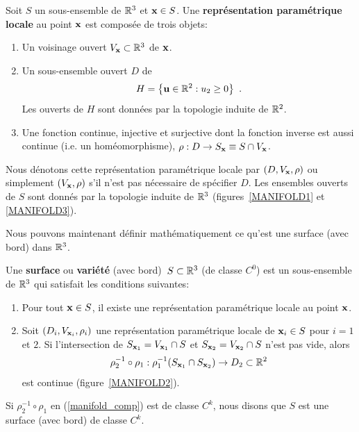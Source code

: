 {\begin{defn} 
Soit $S$ un sous-ensemble de $\mathbb{R}^3$ et $\mathbf{x} \in S$.  Une
{\bfseries représentation paramétrique locale} au point $\mathbf{x}$ est
composée de trois objets:
\begin{enumerate}
\item Un voisinage ouvert $V_{\mathbf{x}} \subset \mathbb{R}^3$ de $\mathbf{x}$.
\item Un sous-ensemble ouvert $D$ de
\[
H = \left\{ \mathbf{u} \in \mathbb{R}^2 : u_2 \geq 0 \right\} \ .
\]
Les ouverts de $H$ sont données par la topologie induite de $\mathbb{R}^2$.
\item Une fonction continue, injective et surjective dont la fonction inverse
est aussi continue (i.e. un homéomorphisme),
$\rho:D\rightarrow S_{\mathbf{x}} \equiv S \cap V_{\mathbf{x}}$.
\end{enumerate}
Nous dénotons cette représentation paramétrique locale par
$(D,V_{\mathbf{x}},\rho)$ ou simplement $(V_{\mathbf{x}},\rho)$ s'il n'est
pas nécessaire de spécifier $D$.  Les ensembles ouverts de $S$ sont donnés par
la topologie induite de $\mathbb{R}^3$ (figures~\ref{MANIFOLD1} et
\ref{MANIFOLD3}).
\end{defn}


Nous pouvons maintenant définir mathématiquement ce qu'est une surface
(avec bord) dans $\mathbb{R}^3$.

\begin{defn}
Une {\bfseries surface} ou
{\bfseries variété} (avec bord)\footnotemark\ 
$S \subset \mathbb{R}^3$ (de classe $C^0$) est un sous-ensemble de $\mathbb{R}^3$
qui satisfait les conditions suivantes:
\begin{enumerate}
\item Pour tout $\mathbf{x} \in S$, il existe une représentation paramétrique
locale au point $\mathbf{x}$.
\item Soit $(D_i,V_{\mathbf{x}_i},\rho_i)$ une représentation
paramétrique locale de $\mathbf{x}_i \in S$ pour $i=1$ et $2$.
Si l'intersection de $S_{\mathbf{x}_1} = V_{\mathbf{x}_1} \cap S$ et
$S_{\mathbf{x}_2} = V_{\mathbf{x}_2} \cap S$ n'est pas vide, alors
\begin{equation} \label{manifold_comp}
\rho_2^{-1} \circ \rho_1:\rho_1^{-1}(S_{\mathbf{x}_1} \cap S_{\mathbf{x}_2})
\rightarrow D_2 \subset \mathbb{R}^2
\end{equation}
est continue (figure~\ref{MANIFOLD2}).
\end{enumerate}
Si $\rho_2^{-1} \circ \rho_1$ en (\ref{manifold_comp}) est de classe
$C^k$, nous disons que $S$ est une surface (avec bord) de classe $C^k$.
\end{defn}

}
